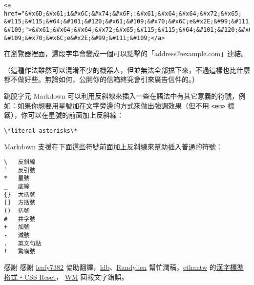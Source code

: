 \begin{verbatim}
<a href="&#x6D;&#x61;i&#x6C;&#x74;&#x6F;:&#x61;&#x64;&#x64;&#x72;&#x65;
&#115;&#115;&#64;&#101;&#120;&#x61;&#109;&#x70;&#x6C;e&#x2E;&#99;&#111;
&#109;">&#x61;&#x64;&#x64;&#x72;&#x65;&#115;&#115;&#64;&#101;&#120;&#x61;
&#109;&#x70;&#x6C;e&#x2E;&#99;&#111;&#109;</a>
\end{verbatim}
在瀏覽器裡面，這段字串會變成一個可以點擊的「address@example.com」連結。

（這種作法雖然可以混淆不少的機器人，但並無法全部擋下來，不過這樣也比什麼都不做好些。無論如何，公開你的信箱終究會引來廣告信件的。）

跳脫字元
Markdown
可以利用反斜線來插入一些在語法中有其它意義的符號，例如：如果你想要用星號加在文字旁邊的方式來做出強調效果（但不用
\texttt{\textless{}em\textgreater{}} 標籤），你可以在星號的前面加上反斜線：

\begin{verbatim}
\*literal asterisks\*
\end{verbatim}
Markdown 支援在下面這些符號前面加上反斜線來幫助插入普通的符號：

\begin{verbatim}
\   反斜線
`   反引號
*   星號
_   底線
{}  大括號
[]  方括號
()  括號
#   井字號
+   加號
-   減號
.   英文句點
!   驚嘆號
\end{verbatim}
感謝
感謝 \href{https://twitter.com/\#!/leafy7382}{leafy7382}
協助翻譯，\href{http://iamhlb.com/}{hlb}、\href{http://twitter.com/randylien}{Randylien}
幫忙潤稿，\href{https://twitter.com/\#!/ethantw}{ethantw}
的\href{http://ethantw.net/projects/han/}{漢字標準格式・CSS Reset}，
\href{http://kidwm.net/}{WM} 回報文字錯誤。
